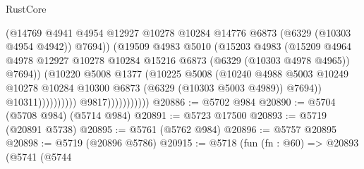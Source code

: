 \begin{lexlean}{RustCore}
\begin{coremodule}
                                            (@14769
                                              @4941
                                              @4954
                                              @12927
                                              @10278
                                              @10284
                                              @14776
                                              @6873
                                              (@6329 (@10303 @4954 @4942))
                                              @7694))
                                          (@19509
                                            @4983
                                            @5010
                                            (@15203
                                              @4983
                                              (@15209
                                                @4964
                                                @4978
                                                @12927
                                                @10278
                                                @10284
                                                @15216
                                                @6873
                                                (@6329 (@10303 @4978 @4965))
                                                @7694))
                                            (@10220
                                              @5008
                                              @1377
                                              (@10225
                                                @5008
                                                (@10240
                                                  @4988
                                                  @5003
                                                  @10249
                                                  @10278
                                                  @10284
                                                  @10300
                                                  @6873
                                                  (@6329 (@10303 @5003 @4989))
                                                  @7694))
                                              @10311))))))))))
                          @9817)))))))))))
@20886 := @5702 @984
@20890 := @5704 (@5708 @984) (@5714 @984)
@20891 := @5723 @17500
@20893 := @5719 (@20891 @5738)
@20895 := @5761 (@5762 @984)
@20896 := @5757 @20895
@20898 := @5719 (@20896 @5786)
@20915 := @5718
    (fun (fn : @60) =>
    @20893
      (@5741
        (@5744

\end{coremodule}
\end{lexlean}
